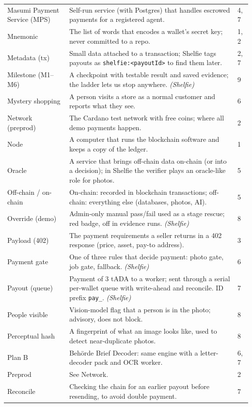 {\begin{longtable}{@{}p{3.4cm}p{10.6cm}p{1.2cm}@{}}
Masumi Payment Service (MPS) & Self-run service (with Postgres) that handles escrowed payments for a registered agent. & 4, 7\\
Mnemonic & The list of words that encodes a wallet's secret key; never committed to a repo. & 1, 2\\
Metadata (tx) & Small data attached to a transaction; Shelfie tags payouts as \texttt{shelfie:<payoutId>} to find them later. & 2, 7\\
Milestone (M1--M6) & A checkpoint with testable result and saved evidence; the ladder lets us stop anywhere. \emph{(Shelfie)} & 9\\
Mystery shopping & A person visits a store as a normal customer and reports what they see. & 6\\
Network (preprod) & The Cardano test network with free coins; where all demo payments happen. & 2\\
Node & A computer that runs the blockchain software and keeps a copy of the ledger. & 1\\
Oracle & A service that brings off-chain data on-chain (or into a decision); in Shelfie the verifier plays an oracle-like role for photos. & 5\\
Off-chain / on-chain & On-chain: recorded in blockchain transactions; off-chain: everything else (databases, photos, AI). & 5\\
Override (demo) & Admin-only manual pass/fail used as a stage rescue; red badge, off in evidence runs. \emph{(Shelfie)} & 8\\
Payload (402) & The payment requirements a seller returns in a 402 response (price, asset, pay-to address). & 3\\
Payment gate & One of three rules that decide payment: photo gate, job gate, fallback. \emph{(Shelfie)} & 6\\
Payout (queue) & Payment of 3 tADA to a worker; sent through a serial per-wallet queue with write-ahead and reconcile. ID prefix \texttt{pay\_}. \emph{(Shelfie)} & 7\\
People visible & Vision-model flag that a person is in the photo; advisory, does not block. & 8\\
Perceptual hash & A fingerprint of what an image looks like, used to detect near-duplicate photos. & 8\\
Plan B & Behörde Brief Decoder: same engine with a letter-decoder pack and OCR worker. & 6, 7\\
Preprod & See Network. & 2\\
Reconcile & Checking the chain for an earlier payout before resending, to avoid double payment. & 7\\

\end{longtable}}

